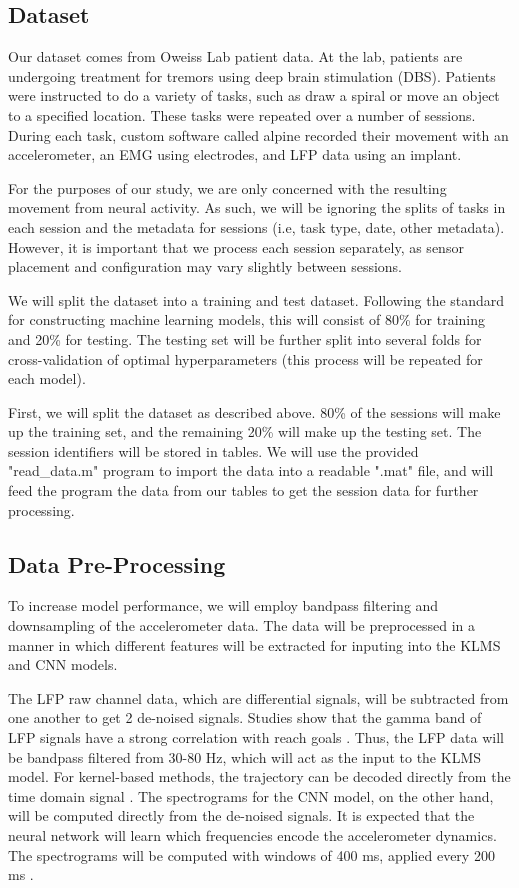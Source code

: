 \documentclass[12pt]{article}
\begin{document}
\subsection{Dataset}

Our dataset comes from Oweiss Lab patient data. At the lab, patients are undergoing treatment for tremors using deep brain stimulation (DBS). Patients were instructed to do a variety of tasks, such as draw a spiral or move an object to a specified location. These tasks were repeated over a number of sessions. During each task, custom software called alpine recorded their movement with an accelerometer, an EMG using electrodes, and LFP data using an implant. 

For the purposes of our study, we are only concerned with the resulting movement from neural activity. As such, we will be ignoring the splits of tasks in each session and the metadata for sessions (i.e, task type, date, other metadata). However, it is important that we process each session separately, as sensor placement and configuration may vary slightly between sessions.

We will split the dataset into a training and test dataset. Following the standard for constructing machine learning models, this will consist of 80\% for training and 20\% for testing. The testing set will be further split into several folds for cross-validation of optimal hyperparameters (this process will be repeated for each model).

First, we will split the dataset as described above. 80\% of the sessions will make up the training set, and the remaining 20\% will make up the testing set. The session identifiers will be stored in tables. We will use the provided "read\_data.m" program to import the data into a readable ".mat" file, and will feed the program the data from our tables to get the session data for further processing.

\subsection{Data Pre-Processing}

To increase model performance, we will employ bandpass filtering and downsampling of the accelerometer data. The data will be preprocessed in a manner in which different features will be extracted for inputing into the KLMS and CNN models.

The LFP raw channel data, which are differential signals, will be subtracted from one another to get 2 de-noised signals. Studies show that the gamma band of LFP signals have a strong correlation with reach goals \cite{hwang2012}. Thus, the LFP data will be bandpass filtered from 30-80 Hz, which will act as the input to the KLMS model. For kernel-based methods, the trajectory can be decoded directly from the time domain signal \cite{li2012}. The spectrograms for the CNN model, on the other hand, will be computed directly from the de-noised signals. It is expected that the neural network will learn which frequencies encode the accelerometer dynamics. The spectrograms will be computed with windows of 400 ms, applied every 200 ms \cite{zhang2013}.
\end{document}
